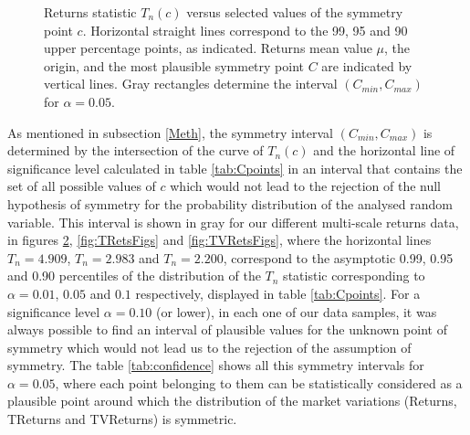 \documentclass{elsarticle}
\begin{document}
\begin{figure}[h!tb]
\begin{subfigure}[b]{0.45\textwidth}
            \label{fig:RetsFigsNikkei}
        \end{subfigure}
        \caption[Plots of statistic $T_{n}(c)$ versus selected values of the symmetry point $c$ for daily simple logarithmic returns of our four analyzed markets]
        {\small Returns statistic $T_{n}(c)$ versus selected values of the symmetry point $c$. Horizontal straight lines correspond to the 99, 95 and 90 upper percentage points, as indicated. Returns mean value $\mu$, the origin, and the most plausible symmetry point $C$ are indicated by vertical lines. Gray rectangles determine the interval $(C_{min},C_{max})$ for $\alpha=0.05$.} 
	\label{fig:RetsFigs}
\end{figure}

As mentioned in subsection \ref{Meth}, the symmetry interval $(C_{min},C_{max})$ is determined by the intersection of the curve of $T_{n}(c)$ and the horizontal line of significance level calculated in table \ref{tab:Cpoints} in an interval that contains the set of all possible values of $c$ which would not lead to the rejection of the null hypothesis of symmetry for the probability distribution of the analysed random variable. This interval is shown in gray for our different multi-scale returns data, in figures \ref{fig:RetsFigs}, \ref{fig:TRetsFigs} and \ref{fig:TVRetsFigs}, where the horizontal lines $T_n=4.909$, $T_n=2.983$ and $T_n=2.200$, correspond to the asymptotic 0.99, 0.95 and 0.90 percentiles of the distribution of the $T_{n}$ statistic corresponding to $\alpha=0.01$, $0.05$ and $0.1$ respectively, displayed in table \ref{tab:Cpoints}. For a significance level $\alpha=0.10$ (or lower), in each one of our data samples, it was always possible to find an interval of plausible values for the unknown point of symmetry which would not lead us to the rejection of the assumption of symmetry. The table \ref{tab:confidence} shows all this symmetry intervals for $\alpha=0.05$, where each point belonging to them can be statistically considered as a plausible point around which the distribution of the market variations (Returns, TReturns and TVReturns) is symmetric.
\end{document}
